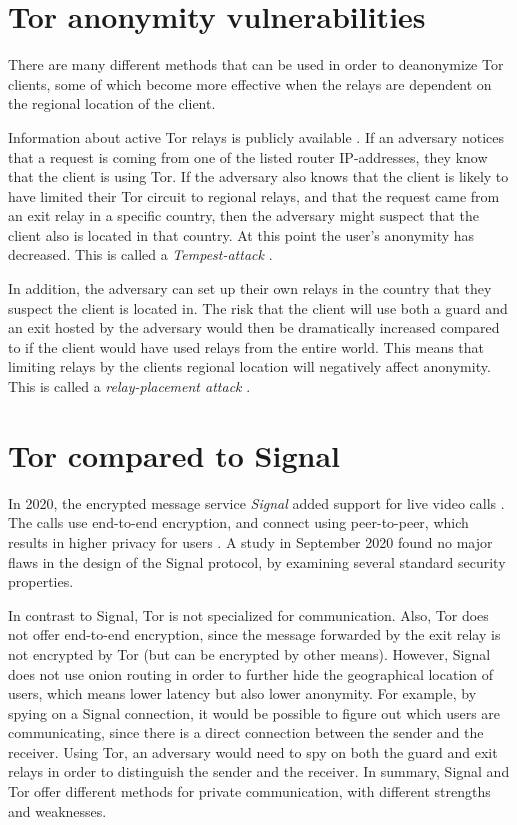 \documentclass{kththesis}
\begin{document}
\section{Tor anonymity vulnerabilities}
There are many different methods that can be used in order to deanonymize Tor clients, some of which become more effective when the relays are dependent on the regional location of the client. 

Information about active Tor relays is publicly available \parencite{TorRelaySearch}. If an adversary notices that a request is coming from one of the listed router IP-addresses, they know that the client is using Tor. If the adversary also knows that the client is likely to have limited their Tor circuit to regional relays, and that the request came from an exit relay in a specific country, then the adversary might suspect that the client also is located in that country. At this point the user's anonymity has decreased. This is called a \emph{Tempest-attack} \parencite{wails2018tempest}\parencite{CLAPS}.

In addition, the adversary can set up their own relays in the country that they suspect the client is located in. The risk that the client will use both a guard and an exit hosted by the adversary would then be dramatically increased compared to if the client would have used relays from the entire world. This means that limiting relays by the clients regional location will negatively affect anonymity. This is called a \emph{relay-placement attack} \parencite{guardPlacementAttacks}\parencite{CLAPS}.

\section{Tor compared to Signal}
In 2020, the encrypted message service \emph{Signal} added support for live video calls \parencite{signal}. The calls use end-to-end encryption, and connect using peer-to-peer, which results in higher privacy for users \parencite{signalPeerToPeer}. A study \parencite{cohn2020formalsecurity} in September 2020 found no major flaws in the design of the Signal protocol, by examining several standard security properties. 

In contrast to Signal, Tor is not specialized for communication. Also, Tor does not offer end-to-end encryption, since the message forwarded by the exit relay is not encrypted by Tor (but can be encrypted by other means). However, Signal does not use onion routing in order to further hide the geographical location of users, which means lower latency but also lower anonymity. For example, by spying on a Signal connection, it would be possible to figure out which users are communicating, since there is a direct connection between the sender and the receiver. Using Tor, an adversary would need to spy on both the guard and exit relays in order to distinguish the sender and the receiver. In summary, Signal and Tor offer different methods for private communication, with different strengths and weaknesses.
\end{document}
